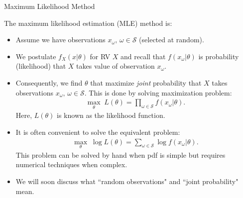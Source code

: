 \documentclass[9pt]{beamer}
\begin{document}
%
\begin{frame}{Maximum Likelihood Method}

The maximum likelihood estimation (MLE) method is:

\begin{itemize}
\item Assume we have observations $x_\omega,\, \omega \in \mathcal{S}$ (selected at random).
\item We postulate $f_X(x|\theta)$ for RV $X$ and recall that $f(x_\omega|\theta)$ is probability (likelihood) that $X$ takes  value of observation $x_\omega$.  

\item Consequently, we find $\theta$ that maximize {\em joint} probability that $X$ takes observations $x_\omega,\,\omega \in \mathcal{S}$. This is done by solving maximization problem:
\begin{align*}
\max_\theta\; L(\theta)=\prod_{\omega \in \mathcal{S}}f(x_\omega|\theta).
\end{align*}
Here, $L(\theta)$ is known as the likelihood function. 

\item It is often convenient to solve the equivalent problem:
\begin{align*}
\max_\theta\; \log L(\theta)=\sum_{\omega \in \mathcal{S}}\log f(x_\omega|\theta).
\end{align*}
This problem can be solved by hand when pdf is simple but requires numerical techniques when complex. 
\item We will soon discuss what ``random observations" and ``joint probability" mean. 
\end{itemize}

\end{frame}
\end{document}
